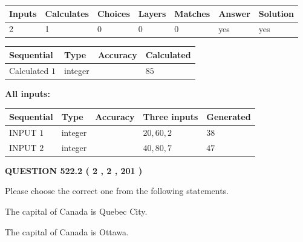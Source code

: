 \documentclass[12pt]{article}
\begin{document}
   
   
   
\noindent\begin{tabular}{|l|l|l|l|l|l|l|}
 \hline
Inputs & Calculates & Choices & Layers & Matches & Answer & Solution \\ \hline
 2  & 
 1  & 
 0
  & 
 0  & 
 0  & 
  yes & 
  yes 
  \\ \hline
 \end{tabular}
   
   
   
   
\noindent{}
   
   
  
  
\noindent\begin{tabular}{|l|l|l|l|}
\hline
 Sequential & Type & Accuracy & Calculated \\ 
\hline
 
 
  Calculated $  1 $ & integer &  & 
  $ 85 $ 
 \\  \hline  
 \end{tabular}
   
   
   
   
\noindent\vspace{0.1in}\hspace{-0.08in} {\textbf{\Large{All inputs: }}}
   
   
  
  
\noindent\begin{tabular}{|l|l|l|l|l|}
\hline
 Sequential & Type & Accuracy & Three inputs & Generated \\ 
\hline
 
 
  INPUT $  1 $ & integer &  & $
 20
 , 
 60
 , 
 2
 $ & $ 38 $ 
 \\  \hline  
 
 
  INPUT $  2 $ & integer &  & $
 40
 , 
 80
 , 
 7
 $ & $ 47 $ 
 \\  \hline  
 \end{tabular}
   
   
  
\vspace{0.2in}
  
{\textbf{\Large{QUESTION
522.2 
 ( 2 , 2 , 201 )
}}}
  
  
Please choose the correct one from the following statements.
 
 
The capital of Canada is Quebec City.
 
 
The capital of Canada is Ottawa.
 
\end{document}
